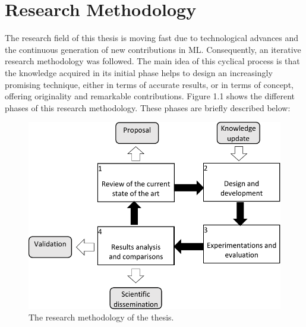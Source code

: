 \section{Research Methodology}
\label{sec:1_introduction_methodology}
The research field of this thesis is moving fast due to technological advances and the continuous generation of new contributions in ML. Consequently, an iterative research methodology was followed. The main idea of this cyclical process is that the knowledge acquired in its initial phase helps to design an increasingly promising technique,
either in terms of accurate results, or in terms of concept, offering originality and remarkable contributions. Figure 1.1 shows the different phases of this research methodology.
These phases are briefly described below:

\begin{figure}[!ht]
    \centering
    \includegraphics[width=.8\textwidth]{1_introduction/figures/fig_research-methodo.pdf}
    \caption{The research methodology of the thesis.}
    \label{ch1:research-emthodo}
\end{figure}

